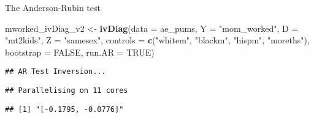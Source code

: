 \documentclass[
  ignorenonframetext,
]{beamer}
\newenvironment{Shaded}{\begin{snugshade}}{\end{snugshade}}
\newcommand{\AttributeTok}[1]{\textcolor[rgb]{0.13,0.29,0.53}{#1}}
\newcommand{\ConstantTok}[1]{\textcolor[rgb]{0.56,0.35,0.01}{#1}}
\newcommand{\FunctionTok}[1]{\textcolor[rgb]{0.13,0.29,0.53}{\textbf{#1}}}
\newcommand{\NormalTok}[1]{#1}
\newcommand{\OtherTok}[1]{\textcolor[rgb]{0.56,0.35,0.01}{#1}}
\newcommand{\SpecialCharTok}[1]{\textcolor[rgb]{0.81,0.36,0.00}{\textbf{#1}}}
\newcommand{\StringTok}[1]{\textcolor[rgb]{0.31,0.60,0.02}{#1}}
\begin{document}
\begin{frame}[fragile]{The Anderson-Rubin test}
\label{the-anderson-rubin-test-1}
\scriptsize

\begin{Shaded}
\begin{Highlighting}[]
\NormalTok{mworked\_ivDiag\_v2 }\OtherTok{\textless{}{-}} \FunctionTok{ivDiag}\NormalTok{(}\AttributeTok{data =}\NormalTok{ ae\_pums,}
                         \AttributeTok{Y =} \StringTok{"mom\_worked"}\NormalTok{,}
                         \AttributeTok{D =} \StringTok{"mt2kids"}\NormalTok{,}
                         \AttributeTok{Z =} \StringTok{"samesex"}\NormalTok{,}
                         \AttributeTok{controls =} \FunctionTok{c}\NormalTok{(}\StringTok{"whitem"}\NormalTok{, }\StringTok{"blackm"}\NormalTok{, }\StringTok{"hispm"}\NormalTok{, }\StringTok{"moreths"}\NormalTok{),}
                         \AttributeTok{bootstrap =} \ConstantTok{FALSE}\NormalTok{,}
                         \AttributeTok{run.AR =} \ConstantTok{TRUE}\NormalTok{)}
\end{Highlighting}
\end{Shaded}

\begin{verbatim}
## AR Test Inversion...
\end{verbatim}

\begin{verbatim}
## Parallelising on 11 cores
\end{verbatim}

\begin{Shaded}
\end{Shaded}

\begin{verbatim}
## [1] "[-0.1795, -0.0776]"
\end{verbatim}
\end{frame}
\end{document}
